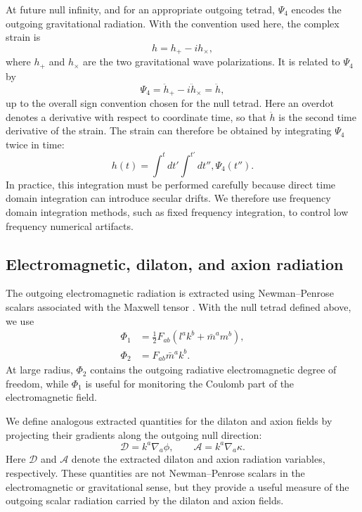 At future null infinity, and for an appropriate outgoing tetrad, $\Psi_4$ encodes the outgoing gravitational radiation. With the convention used here, the complex strain is
\begin{equation}
h
=
h_+
-
i h_\times ,
\end{equation}
where $h_+$ and $h_\times$ are the two gravitational wave polarizations. It is related to $\Psi_4$ by
\begin{equation}
    \Psi_4 = \ddot{h}_+ - i\ddot{h}_\times
           = \ddot{h},
    \label{eq:app_waveex_psi4-strain}
\end{equation}
up to the overall sign convention chosen for the null tetrad. Here an overdot denotes a derivative with respect to coordinate time, so that $\ddot{h}$ is the second time derivative of the strain. The strain can therefore be obtained by integrating $\Psi_4$ twice in time:
\begin{equation}
h(t)
=
\int^t dt'
\int^{t'} dt'',
\Psi_4(t'') .
\label{eq:app waveex strain integral}
\end{equation}
In practice, this integration must be performed carefully because direct time domain integration can introduce secular drifts. We therefore use frequency domain integration methods, such as fixed frequency integration, to control low frequency numerical artifacts.

\subsection{Electromagnetic, dilaton, and axion radiation}

The outgoing electromagnetic radiation is extracted using Newman--Penrose scalars associated with the Maxwell tensor \cite{Newman1962,Zilhao2014}. With the null tetrad defined above, we use
\begin{align}
    \Phi_1
    &=
    \frac{1}{2}
    F_{ab}
    \left(
        l^a k^b
        +
        \bar{m}^a m^b
    \right),
    \label{eq:app waveex phi1-def}
    \\
    \Phi_2
    &=
    F_{ab}\bar{m}^a k^b .
    \label{eq:app waveex phi2-def}
\end{align}
At large radius, $\Phi_2$ contains the outgoing radiative electromagnetic degree of freedom, while $\Phi_1$ is useful for monitoring the Coulomb part of the electromagnetic field.

We define analogous extracted quantities for the dilaton and axion fields by projecting their gradients along the outgoing null direction:
\begin{equation}
    \mathcal{D}
    =
    k^a\nabla_a\phi,
    \qquad
    \mathcal{A}
    =
    k^a\nabla_a\kappa .
    \label{eq:app waveex scalar radiation}
\end{equation}
Here $\mathcal{D}$ and $\mathcal{A}$ denote the extracted dilaton and axion radiation variables, respectively. These quantities are not Newman--Penrose scalars in the electromagnetic or gravitational sense, but they provide a useful measure of the outgoing scalar radiation carried by the dilaton and axion fields.


